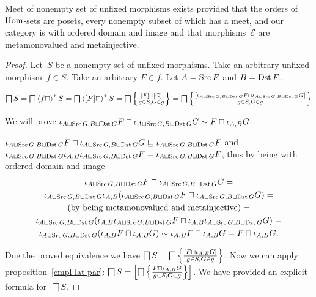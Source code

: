 \begin{thm}
Meet of nonempty set of unfixed morphisms
exists provided that the orders of $\operatorname{Hom}$-sets are
posets, every nonempty subset of which has a meet, and
our category is with ordered domain
and image and that morphisms~$\mathcal{E}$ are metamonovalued
and metainjective.
\end{thm}

\begin{proof}
Let~$S$ be a nonempty set of unfixed morphisms. Take
an arbitrary unfixed morphism~$f\in S$. Take an
arbitrary $F\in f$. Let $A=\operatorname{Src} F$ and $B=\operatorname{Dst} F$.

$\bigsqcap S=\bigsqcap\left\langle f\sqcap\right\rangle ^{\ast}S=
\bigsqcap\left\langle [F]\sqcap\right\rangle ^{\ast}S=
\bigsqcap\left\{ \frac{[F]\sqcap[G]}{g\in S,G\in g}\right\}=
\bigsqcap\left\{ \frac{[\iota_{A\sqcup\operatorname{Src} G,B\sqcup\operatorname{Dst} G}F\sqcap\iota_{A\sqcup\operatorname{Src} G,B\sqcup\operatorname{Dst} G}G]}{g\in S,G\in g}\right\}$

We will prove
$\iota_{A\sqcup\operatorname{Src} G,B\sqcup\operatorname{Dst} G}F\sqcap\iota_{A\sqcup\operatorname{Src} G,B\sqcup\operatorname{Dst} G}G \sim F\sqcap\iota_{A,B}G$.

$\iota_{A\sqcup\operatorname{Src} G,B\sqcup\operatorname{Dst} G}F\sqcap\iota_{A\sqcup\operatorname{Src} G,B\sqcup\operatorname{Dst} G}G\sqsubseteq
\iota_{A\sqcup\operatorname{Src} G,B\sqcup\operatorname{Dst} G}F$ and
$\iota_{A\sqcup\operatorname{Src} G,B\sqcup\operatorname{Dst} G}\iota_{A,B}\iota_{A\sqcup\operatorname{Src} G,B\sqcup\operatorname{Dst} G}F=
\iota_{A\sqcup\operatorname{Src} G,B\sqcup\operatorname{Dst} G}F$, thus by
being with ordered domain and image
\begin{multline*}
\iota_{A\sqcup\operatorname{Src} G,B\sqcup\operatorname{Dst} G}F\sqcap\iota_{A\sqcup\operatorname{Src} G,B\sqcup\operatorname{Dst} G}G = \\
\iota_{A\sqcup\operatorname{Src} G,B\sqcup\operatorname{Dst} G}\iota_{A,B}(\iota_{A\sqcup\operatorname{Src} G,B\sqcup\operatorname{Dst} G}F\sqcap\iota_{A\sqcup\operatorname{Src} G,B\sqcup\operatorname{Dst} G}G) = \\
\text{(by being metamonovalued and metainjective)} = \\
\iota_{A\sqcup\operatorname{Src} G,B\sqcup\operatorname{Dst} G}(
\iota_{A,B}\iota_{A\sqcup\operatorname{Src} G,B\sqcup\operatorname{Dst} G}F\sqcap
\iota_{A,B}\iota_{A\sqcup\operatorname{Src} G,B\sqcup\operatorname{Dst} G}G) = \\
\iota_{A\sqcup\operatorname{Src} G,B\sqcup\operatorname{Dst} G}(
\iota_{A,B}F\sqcap\iota_{A,B}G) \sim
\iota_{A,B}F\sqcap\iota_{A,B}G=
F\sqcap\iota_{A,B}G.
\end{multline*}

Due the proved equivalence we have
$\bigsqcap S=
\bigsqcap\left\{ \frac{[F\sqcap\iota_{A,B}G]}{g\in S,G\in g}\right\}$.
Now we can apply proposition~\ref{cmpl-lat-par}:
$\bigsqcap S=
\left[\bigsqcap\left\{ \frac{F\sqcap\iota_{A,B}G}{g\in S,G\in g}\right\}\right]$. We have provided an explicit formula
for~$\bigsqcap S$.
\end{proof}

